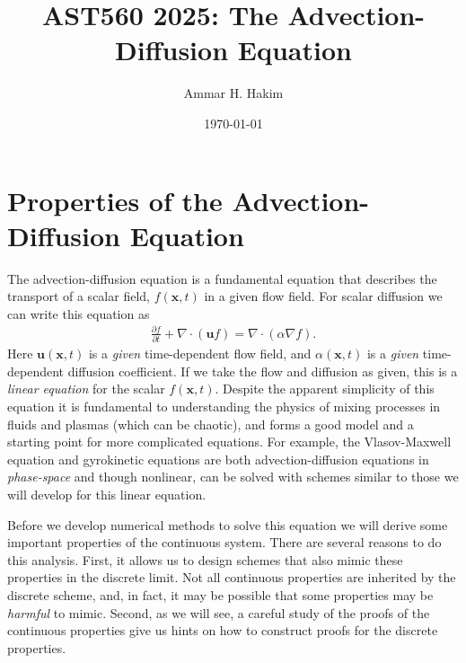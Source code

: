 \documentclass[12pt]{article}
\title{AST560 2025: The Advection-Diffusion Equation}%
\author{Ammar H. Hakim}%
\date{\today}
\theoremstyle{definition}
\theoremstyle{definition}
\theoremstyle{definition}
\newcommand{\pfrac}[2]{\frac{\partial #1}{\partial #2}}
\newcommand{\mvec}[1]{\mathbf{#1}}
\newcommand{\gcn}{\nabla}
\begin{document}
\maketitle

\tableofcontents

\section{Properties of the Advection-Diffusion Equation}

The advection-diffusion equation is a fundamental equation that
describes the transport of a scalar field, $f(\mvec{x},t)$ in a given
flow field. For scalar diffusion we can write this equation as
\begin{align}
  \pfrac{f}{t}
  +
  \gcn\cdot(\mvec{u} f)
  =
  \gcn\cdot(\alpha \gcn f).
  \label{eq:adv-diff}
\end{align}
Here $\mvec{u}(\mvec{x},t)$ is a \emph{given} time-dependent flow
field, and $\alpha(\mvec{x},t)$ is a \emph{given} time-dependent
diffusion coefficient. If we take the flow and diffusion as given,
this is a \emph{linear equation} for the scalar
$f(\mvec{x},t)$. Despite the apparent simplicity of this equation it
is fundamental to understanding the physics of mixing processes in
fluids and plasmas (which can be chaotic), and forms a good model and
a starting point for more complicated equations. For example, the
Vlasov-Maxwell equation and gyrokinetic equations are both
advection-diffusion equations in \emph{phase-space} and though
nonlinear, can be solved with schemes similar to those we will develop
for this linear equation.

Before we develop numerical methods to solve this equation we will
derive some important properties of the continuous system. There are
several reasons to do this analysis. First, it allows us to design
schemes that also mimic these properties in the discrete limit. Not
all continuous properties are inherited by the discrete scheme, and,
in fact, it may be possible that some properties may be \emph{harmful}
to mimic. Second, as we will see, a careful study of the proofs of the
continuous properties give us hints on how to construct proofs for the
discrete properties.
\end{document}
